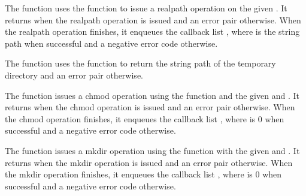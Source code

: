 \begin{function}
\end{function}

The  function uses the
 function to issue a realpath operation on the
given . It returns  when the realpath operation is
issued and an error pair otherwise. When the realpath operation
finishes, it enqueues the callback list , where  is the string path when
successful and a negative error code otherwise.

\begin{function}
\end{function}

The  function uses the
 function to return the string path of the
temporary directory and an error pair otherwise.

\begin{function}
\end{function}

The  function issues a chmod operation using the
 function and the given  and
. It returns  when the chmod operation is issued
and an error pair otherwise. When the chmod operation finishes, it
enqueues the callback list , where
 is 0 when successful and a negative error code otherwise.

\begin{function}
\end{function}

The  function issues a mkdir operation
using the  function with the given  and
. It returns  when the mkdir operation is issued
and an error pair otherwise. When the mkdir operation finishes, it
enqueues the callback list , where
 is 0 when successful and a negative error code otherwise.

